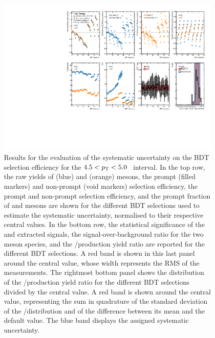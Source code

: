 \begin{figure}[h!]
    \begin{center}
    \includegraphics[width=\textwidth]{Figures/Chapter 6/BDTsyst.pdf}
    \caption{Results for the evaluation of the systematic uncertainty on the BDT selection efficiency for the \mbox{$4.5<p_\mathrm{T}<5.0$~\gevc} \pt interval. In the top row, the raw yields of \ds (blue) and \dpl (orange) mesons, the prompt (filled markers) and non-prompt (void markers) \ds selection efficiency, the prompt and non-prompt \dpl selection efficiency, and the prompt fraction of \ds and \dpl mesons are shown for the different BDT selections used to estimate the systematic uncertainty, normalised to their respective central values. In the bottom row, the statistical significance of the \ds and \dpl extracted signals, the signal-over-background ratio for the two meson species, and the \ds/\dpl production yield ratio are reported for the different BDT selections. A red band is shown in this last panel around the central value, whose width represents the RMS of the measurements. The rightmost bottom panel shows the distribution of the \ds/\dpl production yield ratio for the different BDT selections divided by the central value. A red band is shown around the central value, representing the sum in quadrature of the standard deviation of the \ds/\dpl distribution and of the difference between its mean and the default value. The blue band displays the assigned systematic uncertainty.} 
    \label{fig:BDT_efficiency} 
    \end{center}
\end{figure}

